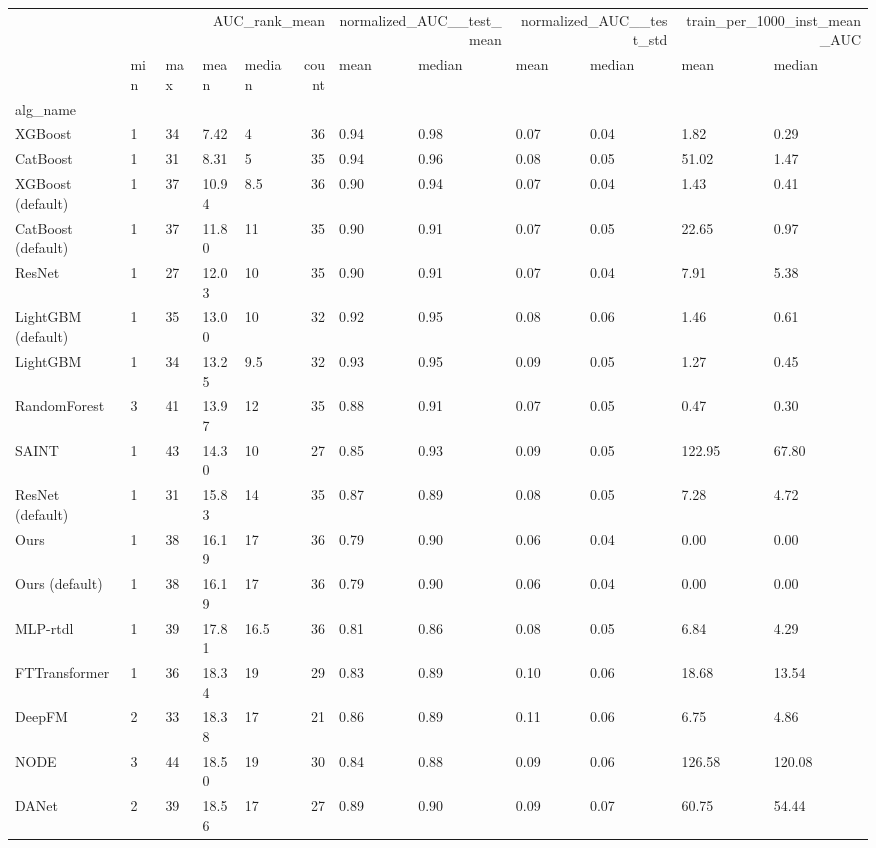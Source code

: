 \begin{tabular}{lllllrllllll}
\toprule
 & \multicolumn{5}{r}{AUC_rank_mean} & \multicolumn{2}{r}{normalized_AUC__test_mean} & \multicolumn{2}{r}{normalized_AUC__test_std} & \multicolumn{2}{r}{train_per_1000_inst_mean_AUC} \\
 & min & max & mean & median & count & mean & median & mean & median & mean & median \\
alg_name &  &  &  &  &  &  &  &  &  &  &  \\
\midrule
XGBoost & 1 & 34 & 7.42 & 4 & 36 & 0.94 & 0.98 & 0.07 & 0.04 & 1.82 & 0.29 \\
CatBoost & 1 & 31 & 8.31 & 5 & 35 & 0.94 & 0.96 & 0.08 & 0.05 & 51.02 & 1.47 \\
XGBoost (default) & 1 & 37 & 10.94 & 8.5 & 36 & 0.90 & 0.94 & 0.07 & 0.04 & 1.43 & 0.41 \\
CatBoost (default) & 1 & 37 & 11.80 & 11 & 35 & 0.90 & 0.91 & 0.07 & 0.05 & 22.65 & 0.97 \\
ResNet & 1 & 27 & 12.03 & 10 & 35 & 0.90 & 0.91 & 0.07 & 0.04 & 7.91 & 5.38 \\
LightGBM (default) & 1 & 35 & 13.00 & 10 & 32 & 0.92 & 0.95 & 0.08 & 0.06 & 1.46 & 0.61 \\
LightGBM & 1 & 34 & 13.25 & 9.5 & 32 & 0.93 & 0.95 & 0.09 & 0.05 & 1.27 & 0.45 \\
RandomForest & 3 & 41 & 13.97 & 12 & 35 & 0.88 & 0.91 & 0.07 & 0.05 & 0.47 & 0.30 \\
SAINT & 1 & 43 & 14.30 & 10 & 27 & 0.85 & 0.93 & 0.09 & 0.05 & 122.95 & 67.80 \\
ResNet (default) & 1 & 31 & 15.83 & 14 & 35 & 0.87 & 0.89 & 0.08 & 0.05 & 7.28 & 4.72 \\
Ours & 1 & 38 & 16.19 & 17 & 36 & 0.79 & 0.90 & 0.06 & 0.04 & 0.00 & 0.00 \\
Ours (default) & 1 & 38 & 16.19 & 17 & 36 & 0.79 & 0.90 & 0.06 & 0.04 & 0.00 & 0.00 \\
MLP-rtdl & 1 & 39 & 17.81 & 16.5 & 36 & 0.81 & 0.86 & 0.08 & 0.05 & 6.84 & 4.29 \\
FTTransformer & 1 & 36 & 18.34 & 19 & 29 & 0.83 & 0.89 & 0.10 & 0.06 & 18.68 & 13.54 \\
DeepFM & 2 & 33 & 18.38 & 17 & 21 & 0.86 & 0.89 & 0.11 & 0.06 & 6.75 & 4.86 \\
NODE & 3 & 44 & 18.50 & 19 & 30 & 0.84 & 0.88 & 0.09 & 0.06 & 126.58 & 120.08 \\
DANet & 2 & 39 & 18.56 & 17 & 27 & 0.89 & 0.90 & 0.09 & 0.07 & 60.75 & 54.44 \\

\end{tabular}
